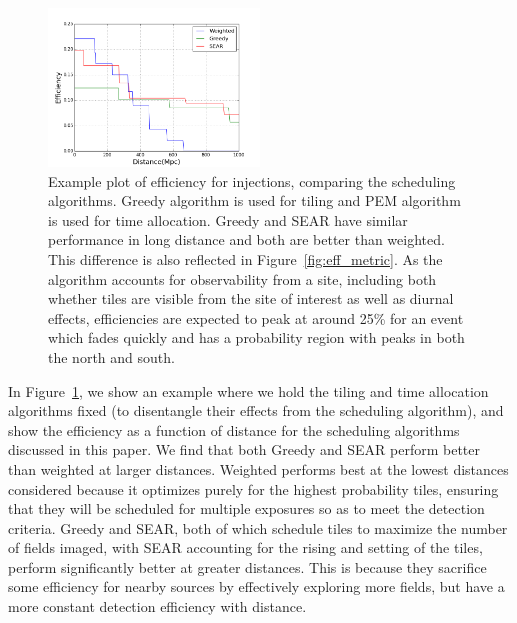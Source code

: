 \documentclass[twocolumn]{aastex62}
\begin{document}
\begin{figure}[t]
\centering
\includegraphics[width=0.5\textwidth]{plots/eff_ex.png}
\caption{Example plot of efficiency for \cite{Me2017} injections, comparing the scheduling algorithms. Greedy algorithm is used for tiling and PEM algorithm is used for time allocation. Greedy and SEAR have similar performance in long distance and both are better than weighted. This difference is also reflected in Figure~\ref{fig:eff_metric}. As the algorithm accounts for observability from a site, including both whether tiles are visible from the site of interest as well as diurnal effects, efficiencies are expected to peak at around 25\% for an event which fades quickly and has a probability region with peaks in both the north and south.}
\label{fig:eff_ex}
\end{figure}
In Figure~\ref{fig:eff_ex}, we show an example where we hold the tiling and time allocation algorithms fixed (to disentangle their effects from the scheduling algorithm), and show the efficiency as a function of distance for the scheduling algorithms discussed in this paper. We find that both Greedy and SEAR perform better than weighted at larger distances. Weighted performs best at the lowest distances considered because it optimizes purely for the highest probability tiles, ensuring that they will be scheduled for multiple exposures so as to meet the detection criteria. Greedy and SEAR, both of which schedule tiles to maximize the number of fields imaged, with SEAR accounting for the rising and setting of the tiles, perform significantly better at greater distances. This is because they sacrifice some efficiency for nearby sources by effectively exploring more fields, but have a more constant detection efficiency with distance.
\end{document}
